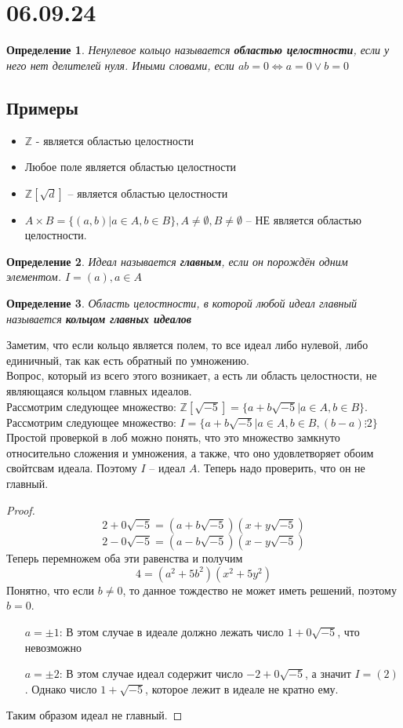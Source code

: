 \documentclass[12pt, a4paper]{article}
\newcommand{\lra}{\Leftrightarrow}
\newcommand{\Z}{\mathds{Z}}
\theoremstyle{plain}
\newtheorem{Def}{Определение}
\theoremstyle{definition}
\begin{document}
\section*{06.09.24}
\begin{Def}
Ненулевое кольцо называется \textbf{областью целостности}, если у него нет делителей нуля. Иными словами, если $ab = 0 \lra a=0 \vee b = 0$
\end{Def}
\subsection*{Примеры}
\begin{itemize}
    \item $\Z$ - является областью целостности
    \item Любое поле является областью целостности
    \item $\Z[\sqrt{d}]$ -- является областью целостности
    \item $A\times B = \{(a,b)|a\in A, b\in B\}, A\neq \emptyset, B\neq \emptyset$ -- НЕ является областью целостности.
\end{itemize}
\begin{Def}
    Идеал называется \textbf{главным}, если он порождён одним элементом. $I = (a), a \in A$
\end{Def}
\begin{Def}
    Область целостности, в которой любой идеал главный называется \textbf{кольцом главных идеалов}
\end{Def}
Заметим, что если кольцо является полем, то все идеал либо нулевой, либо единичный, так как есть обратный по умножению.
\\
Вопрос, который из всего этого возникает, а есть ли область целостности, не являющаяся кольцом главных идеалов.
\\
Рассмотрим следующее множество: $\Z[\sqrt{-5}] = \{a+b\sqrt{-5}| a \in A, b\in B\}$. \\
Рассмотрим следующее множество: $I = \{a+b\sqrt{-5}| a\in A, b\in B, (b-a)\vdots 2\}$ 
\\
Простой проверкой в лоб можно понять, что это множество замкнуто относительно сложения и умножения, а также, что оно удовлетворяет обоим свойтсвам идеала. Поэтому $I$ -- идеал $A$.
Теперь надо проверить, что он не главный. 
\\
\begin{proof}

    \[2+0\sqrt{-5} = (a+b\sqrt{-5})(x+y\sqrt{-5}) \]
    \[2-0\sqrt{-5} = (a-b\sqrt{-5})(x-y\sqrt{-5}) \]
Теперь перемножем оба эти равенства и получим
\[4 = (a^2+5b^2)(x^2+5y^2)\]
Понятно, что если $b\neq 0$, то данное тождество не может иметь решений, поэтому $b=0$.
\begin{enumerate}
    \item[$a = \pm 1$: ] В этом случае в идеале должно лежать число $1+0\sqrt{-5}$, что невозможно
    \item[$a = \pm 2$: ] В этом случае идеал содержит число $-2+0\sqrt{-5}$, а значит $I=(2)$. Однако число $1+\sqrt{-5}$, которое лежит в идеале не кратно ему.
\end{enumerate}
Таким образом идеал не главный.
\end{proof}
\end{document}
